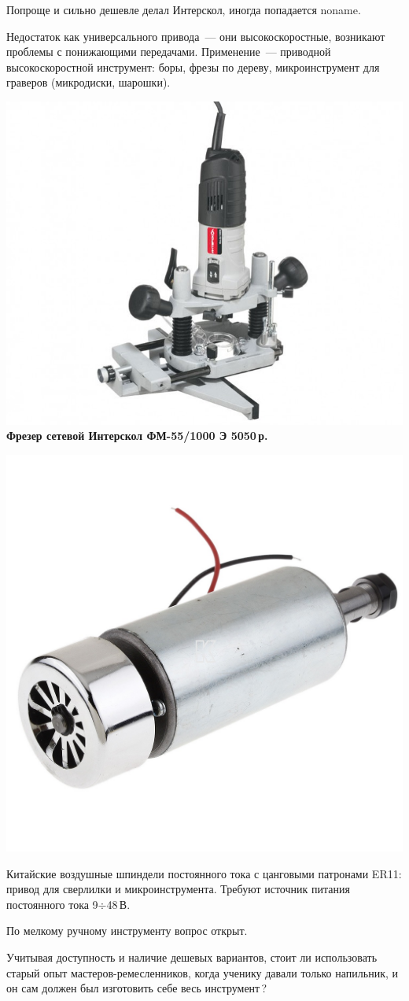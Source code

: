 {\begin{multicols}{2}
\end{multicols}

Попроще и сильно дешевле делал Интерскол, иногда попадается noname.

Недостаток как универсального привода\ --- они высокоскоростные,
возникают проблемы с понижающими передачами. Применение\ --- приводной
высокоскоростной инструмент: боры, фрезы по дереву, микроинструмент для
граверов (микродиски, шарошки).

\begin{multicols}{2}
\noindent\href{http://www.kuvalda.ru/catalog/1867/27920/}{
\includegraphics[width=0.5\columnwidth]{00/fig/InterskolFM55.jpg}}
\textbf{Фрезер сетевой Интерскол ФМ-55/1000 Э 5050\,р.}

\columnclear

\noindent\includegraphics[width=0.5\columnwidth]{00/fig/ER11.jpg}
\end{multicols}

Китайские воздушные шпиндели постоянного тока с цанговыми патронами ER11:
привод для сверлилки и микроинструмента. Требуют источник питания
постоянного тока 9$\div$48\,В.


По мелкому ручному инструменту вопрос открыт.

Учитывая доступность и наличие дешевых вариантов, стоит ли использовать старый
опыт мастеров-ремесленников, когда ученику давали только напильник, и он сам
должен был изготовить себе весь инструмент\,?

}
